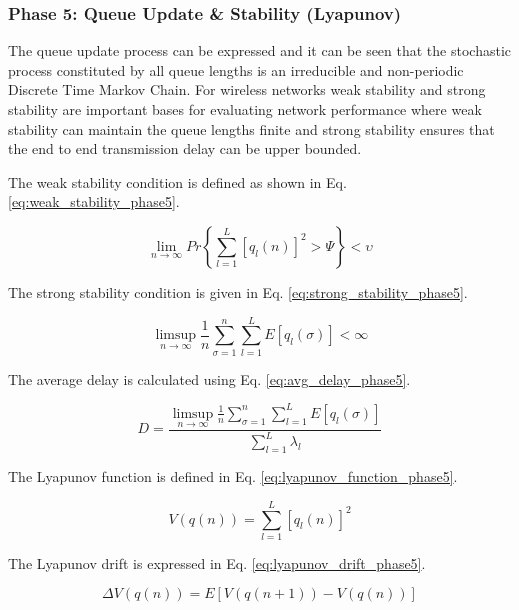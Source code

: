 \documentclass[a4paper,fleqn]{cas-dc}
\numberwithin{equation}{section}
\begin{document}
\subsubsection{Phase 5: Queue Update \& Stability (Lyapunov)}

The queue update process can be expressed and it can be seen that the stochastic process constituted by all queue lengths is an irreducible and non-periodic Discrete Time Markov Chain. For wireless networks weak stability and strong stability are important bases for evaluating network performance where weak stability can maintain the queue lengths finite and strong stability ensures that the end to end transmission delay can be upper bounded.

The weak stability condition is defined as shown in Eq. \ref{eq:weak_stability_phase5}.

\begin{equation}
\lim_{n\to\infty} Pr\left\{\sum_{l=1}^{L}[q_l(n)]^2 > \Psi \right\} < \upsilon
\label{eq:weak_stability_phase5}
\end{equation}

The strong stability condition is given in Eq. \ref{eq:strong_stability_phase5}.

\begin{equation}
\limsup_{n\to\infty} \frac{1}{n} \sum_{\sigma=1}^{n} \sum_{l=1}^{L} E[q_l(\sigma)] < \infty
\label{eq:strong_stability_phase5}
\end{equation}

The average delay is calculated using Eq. \ref{eq:avg_delay_phase5}.

\begin{equation}
D = \frac{\limsup_{n\to\infty} \frac{1}{n} \sum_{\sigma=1}^{n} \sum_{l=1}^{L} E[q_l(\sigma)]}{\sum_{l=1}^{L}\lambda_l}
\label{eq:avg_delay_phase5}
\end{equation}

The Lyapunov function is defined in Eq. \ref{eq:lyapunov_function_phase5}.

\begin{equation}
V(q(n)) = \sum_{l=1}^{L} [q_l(n)]^2
\label{eq:lyapunov_function_phase5}
\end{equation}

The Lyapunov drift is expressed in Eq. \ref{eq:lyapunov_drift_phase5}.

\begin{equation}
\Delta V(q(n)) = E[V(q(n+1)) - V(q(n))]
\label{eq:lyapunov_drift_phase5}
\end{equation}
\end{document}
